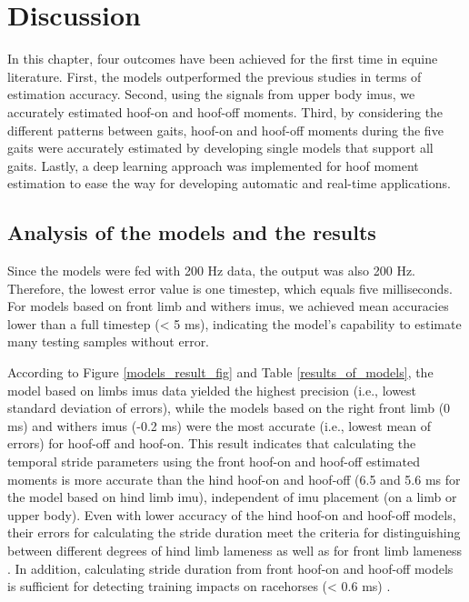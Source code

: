 \section{Discussion}
\label{sec:discussion}

In this chapter, four outcomes have been achieved for the first time in equine literature. First, the models outperformed the previous studies in terms of estimation accuracy. Second, using the signals from upper body \gls{imu}s, we accurately estimated hoof-on and hoof-off moments. Third, by considering the different patterns between gaits, hoof-on and hoof-off moments during the five gaits were accurately estimated by developing single models that support all gaits. Lastly, a deep learning approach was implemented for hoof moment estimation to ease the way for developing automatic and real-time applications.

\subsection{Analysis of the models and the results}


Since the models were fed with 200 Hz data, the output was also 200 Hz. Therefore, the lowest error value is one timestep, which equals five milliseconds. For models based on front limb and withers \gls{imu}s, we achieved mean accuracies lower than a full timestep (< 5 ms), indicating the model's capability to estimate many testing samples without error.


According to Figure \ref{models_result_fig} and Table \ref{results_of_models}, the model based on limbs \gls{imu}s data yielded the highest precision (i.e., lowest standard deviation of errors), while the models based on the right front limb (0 ms) and withers \gls{imu}s (-0.2 ms) were the most accurate (i.e., lowest mean of errors) for hoof-off and hoof-on. This result indicates that calculating the temporal stride parameters using the front hoof-on and hoof-off estimated moments is more accurate than the hind hoof-on and hoof-off (6.5 and 5.6 ms for the model based on hind limb \gls{imu}), independent of \gls{imu} placement (on a limb or upper body). Even with lower accuracy of the hind hoof-on and hoof-off models, their errors for calculating the stride duration meet the criteria for distinguishing between different degrees of hind limb lameness \cite{weishaupt_2010_compensatory} as well as for front limb lameness \cite{weishaupt_2006_compensatory}. In addition, calculating stride duration from front hoof-on and hoof-off models is sufficient for detecting training impacts on racehorses (< 0.6 ms) \cite{parkes_2019_the}.

